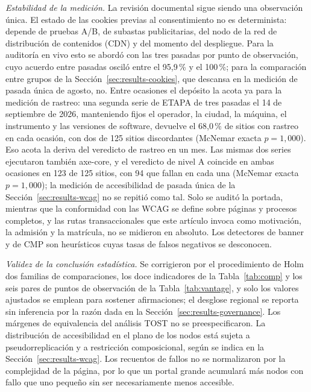 \documentclass[pdflatex,sn-basic,Numbered,iicol]{sn-jnl}
\theoremstyle{thmstyleone}
\theoremstyle{thmstyletwo}
\theoremstyle{thmstylethree}
\begin{document}
\emph{Estabilidad de la medici\'on.} La revisi\'on documental sigue siendo una observaci\'on \'unica. El estado de las cookies previas al consentimiento no es determinista: depende de pruebas A/B, de subastas publicitarias, del nodo de la red de distribuci\'on de contenidos (CDN) y del momento del despliegue. Para la auditor\'ia en vivo esto se abord\'o con las tres pasadas por punto de observaci\'on, cuyo acuerdo entre pasadas oscil\'o entre el 95,9\,\% y el 100\,\%; para la comparaci\'on entre grupos de la Secci\'on~\ref{sec:results-cookies}, que descansa en la medici\'on de pasada \'unica de agosto, no. Entre ocasiones el dep\'osito la acota ya para la medici\'on de rastreo: una segunda serie de ETAPA de tres pasadas el 14 de septiembre de 2026, manteniendo fijos el operador, la ciudad, la m\'aquina, el instrumento y las versiones de software, devuelve el 68,0\,\% de sitios con rastreo en cada ocasi\'on, con dos de 125 sitios discordantes (McNemar exacta $p=1{,}000$). Eso acota la deriva del veredicto de rastreo en un mes. Las mismas dos series ejecutaron tambi\'en axe-core, y el veredicto de nivel A coincide en ambas ocasiones en 123 de 125 sitios, con 94 que fallan en cada una (McNemar exacta $p=1{,}000$); la medici\'on de accesibilidad de pasada \'unica de la Secci\'on~\ref{sec:results-wcag} no se repiti\'o como tal. Solo se audit\'o la portada, mientras que la conformidad con las WCAG se define sobre p\'aginas y procesos completos, y las rutas transaccionales que este art\'iculo invoca como motivaci\'on, la admisi\'on y la matr\'icula, no se midieron en absoluto. Los detectores de banner y de CMP son heur\'isticos cuyas tasas de falsos negativos se desconocen.

\emph{Validez de la conclusi\'on estad\'istica.} Se corrigieron por el procedimiento de Holm dos familias de comparaciones, los doce indicadores de la Tabla~\ref{tab:comp} y los seis pares de puntos de observaci\'on de la Tabla~\ref{tab:vantage}, y solo los valores ajustados se emplean para sostener afirmaciones; el desglose regional se reporta sin inferencia por la raz\'on dada en la Secci\'on~\ref{sec:results-governance}. Los m\'argenes de equivalencia del an\'alisis TOST no se preespecificaron. La distribuci\'on de accesibilidad en el plano de los nodos est\'a sujeta a pseudorreplicaci\'on y a restricci\'on composicional, seg\'un se indica en la Secci\'on~\ref{sec:results-wcag}. Los recuentos de fallos no se normalizaron por la complejidad de la p\'agina, por lo que un portal grande acumular\'a m\'as nodos con fallo que uno peque\~no sin ser necesariamente menos accesible.
\end{document}
